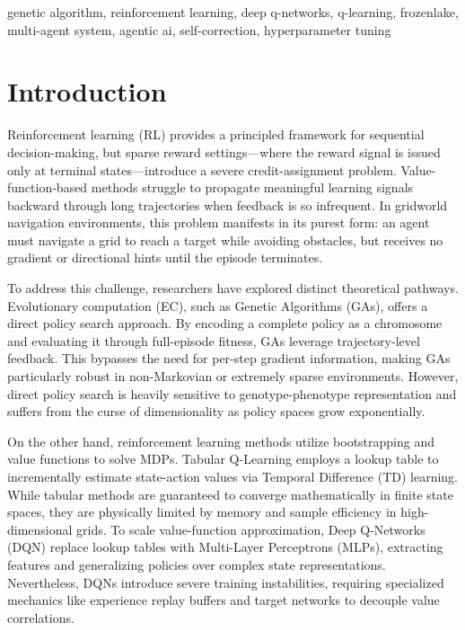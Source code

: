 \documentclass[conference]{IEEEtran}
\begin{document}
\begin{IEEEkeywords}
genetic algorithm, reinforcement learning, deep q-networks, q-learning, frozenlake, multi-agent system, agentic ai, self-correction, hyperparameter tuning
\end{IEEEkeywords}

\section{Introduction}

Reinforcement learning (RL) provides a principled framework for sequential decision-making, but sparse reward settings---where the reward signal is issued only at terminal states---introduce a severe credit-assignment problem. Value-function-based methods struggle to propagate meaningful learning signals backward through long trajectories when feedback is so infrequent. In gridworld navigation environments, this problem manifests in its purest form: an agent must navigate a grid to reach a target while avoiding obstacles, but receives no gradient or directional hints until the episode terminates.

To address this challenge, researchers have explored distinct theoretical pathways. Evolutionary computation (EC), such as Genetic Algorithms (GAs), offers a direct policy search approach. By encoding a complete policy as a chromosome and evaluating it through full-episode fitness, GAs leverage trajectory-level feedback. This bypasses the need for per-step gradient information, making GAs particularly robust in non-Markovian or extremely sparse environments. However, direct policy search is heavily sensitive to genotype-phenotype representation and suffers from the curse of dimensionality as policy spaces grow exponentially.

On the other hand, reinforcement learning methods utilize bootstrapping and value functions to solve MDPs. Tabular Q-Learning employs a lookup table to incrementally estimate state-action values via Temporal Difference (TD) learning. While tabular methods are guaranteed to converge mathematically in finite state spaces, they are physically limited by memory and sample efficiency in high-dimensional grids. To scale value-function approximation, Deep Q-Networks (DQN) replace lookup tables with Multi-Layer Perceptrons (MLPs), extracting features and generalizing policies over complex state representations. Nevertheless, DQNs introduce severe training instabilities, requiring specialized mechanics like experience replay buffers and target networks to decouple value correlations.
\end{document}

